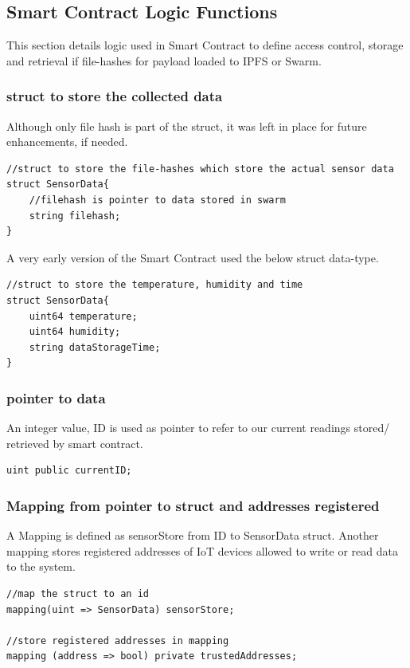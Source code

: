 \documentclass[11pt,openright]{report}
\begin{document}
\subsection{Smart Contract Logic Functions}
This section details logic used in Smart Contract to define access control, storage and retrieval if file-hashes for payload loaded to IPFS or Swarm. 

\subsubsection{struct to store the collected data}
Although only file hash is part of the struct, it was left in place for future enhancements, if needed.
\begin{lstlisting}
//struct to store the file-hashes which store the actual sensor data
struct SensorData{
    //filehash is pointer to data stored in swarm
    string filehash;
}
\end{lstlisting}

A very early version of the Smart Contract used the below struct data-type.

\begin{lstlisting}
//struct to store the temperature, humidity and time 
struct SensorData{
    uint64 temperature;
    uint64 humidity;
    string dataStorageTime;
}
\end{lstlisting}

\subsubsection{pointer to data}
An integer value, ID is used as pointer to refer to our current readings stored/ retrieved by smart contract.
\begin{lstlisting}
uint public currentID;
\end{lstlisting}

\subsubsection{Mapping from pointer to struct and addresses registered}
A Mapping is defined as sensorStore from ID to SensorData struct. Another mapping stores registered addresses of IoT devices allowed to write or read data to the system.
\begin{lstlisting}
//map the struct to an id
mapping(uint => SensorData) sensorStore;

//store registered addresses in mapping
mapping (address => bool) private trustedAddresses;
\end{lstlisting}
\end{document}

